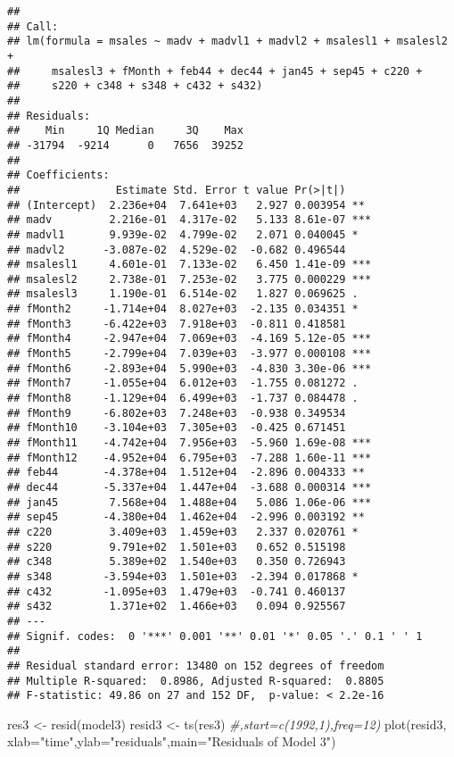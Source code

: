 \documentclass[
]{article}
\newenvironment{Shaded}{\begin{snugshade}}{\end{snugshade}}
\newcommand{\AttributeTok}[1]{\textcolor[rgb]{0.77,0.63,0.00}{#1}}
\newcommand{\CommentTok}[1]{\textcolor[rgb]{0.56,0.35,0.01}{\textit{#1}}}
\newcommand{\FunctionTok}[1]{\textcolor[rgb]{0.00,0.00,0.00}{#1}}
\newcommand{\NormalTok}[1]{#1}
\newcommand{\OtherTok}[1]{\textcolor[rgb]{0.56,0.35,0.01}{#1}}
\newcommand{\StringTok}[1]{\textcolor[rgb]{0.31,0.60,0.02}{#1}}
\begin{document}
\begin{verbatim}
## 
## Call:
## lm(formula = msales ~ madv + madvl1 + madvl2 + msalesl1 + msalesl2 + 
##     msalesl3 + fMonth + feb44 + dec44 + jan45 + sep45 + c220 + 
##     s220 + c348 + s348 + c432 + s432)
## 
## Residuals:
##    Min     1Q Median     3Q    Max 
## -31794  -9214      0   7656  39252 
## 
## Coefficients:
##               Estimate Std. Error t value Pr(>|t|)    
## (Intercept)  2.236e+04  7.641e+03   2.927 0.003954 ** 
## madv         2.216e-01  4.317e-02   5.133 8.61e-07 ***
## madvl1       9.939e-02  4.799e-02   2.071 0.040045 *  
## madvl2      -3.087e-02  4.529e-02  -0.682 0.496544    
## msalesl1     4.601e-01  7.133e-02   6.450 1.41e-09 ***
## msalesl2     2.738e-01  7.253e-02   3.775 0.000229 ***
## msalesl3     1.190e-01  6.514e-02   1.827 0.069625 .  
## fMonth2     -1.714e+04  8.027e+03  -2.135 0.034351 *  
## fMonth3     -6.422e+03  7.918e+03  -0.811 0.418581    
## fMonth4     -2.947e+04  7.069e+03  -4.169 5.12e-05 ***
## fMonth5     -2.799e+04  7.039e+03  -3.977 0.000108 ***
## fMonth6     -2.893e+04  5.990e+03  -4.830 3.30e-06 ***
## fMonth7     -1.055e+04  6.012e+03  -1.755 0.081272 .  
## fMonth8     -1.129e+04  6.499e+03  -1.737 0.084478 .  
## fMonth9     -6.802e+03  7.248e+03  -0.938 0.349534    
## fMonth10    -3.104e+03  7.305e+03  -0.425 0.671451    
## fMonth11    -4.742e+04  7.956e+03  -5.960 1.69e-08 ***
## fMonth12    -4.952e+04  6.795e+03  -7.288 1.60e-11 ***
## feb44       -4.378e+04  1.512e+04  -2.896 0.004333 ** 
## dec44       -5.337e+04  1.447e+04  -3.688 0.000314 ***
## jan45        7.568e+04  1.488e+04   5.086 1.06e-06 ***
## sep45       -4.380e+04  1.462e+04  -2.996 0.003192 ** 
## c220         3.409e+03  1.459e+03   2.337 0.020761 *  
## s220         9.791e+02  1.501e+03   0.652 0.515198    
## c348         5.389e+02  1.540e+03   0.350 0.726943    
## s348        -3.594e+03  1.501e+03  -2.394 0.017868 *  
## c432        -1.095e+03  1.479e+03  -0.741 0.460137    
## s432         1.371e+02  1.466e+03   0.094 0.925567    
## ---
## Signif. codes:  0 '***' 0.001 '**' 0.01 '*' 0.05 '.' 0.1 ' ' 1
## 
## Residual standard error: 13480 on 152 degrees of freedom
## Multiple R-squared:  0.8986, Adjusted R-squared:  0.8805 
## F-statistic: 49.86 on 27 and 152 DF,  p-value: < 2.2e-16
\end{verbatim}

\begin{Shaded}
\begin{Highlighting}[]
\NormalTok{res3 }\OtherTok{\textless{}{-}} \FunctionTok{resid}\NormalTok{(model3)}
\NormalTok{resid3 }\OtherTok{\textless{}{-}} \FunctionTok{ts}\NormalTok{(res3) }\CommentTok{\#,start=c(1992,1),freq=12)}
\FunctionTok{plot}\NormalTok{(resid3, }\AttributeTok{xlab=}\StringTok{"time"}\NormalTok{,}\AttributeTok{ylab=}\StringTok{"residuals"}\NormalTok{,}\AttributeTok{main=}\StringTok{"Residuals of Model 3"}\NormalTok{)}
\end{Highlighting}
\end{Shaded}
\end{document}
